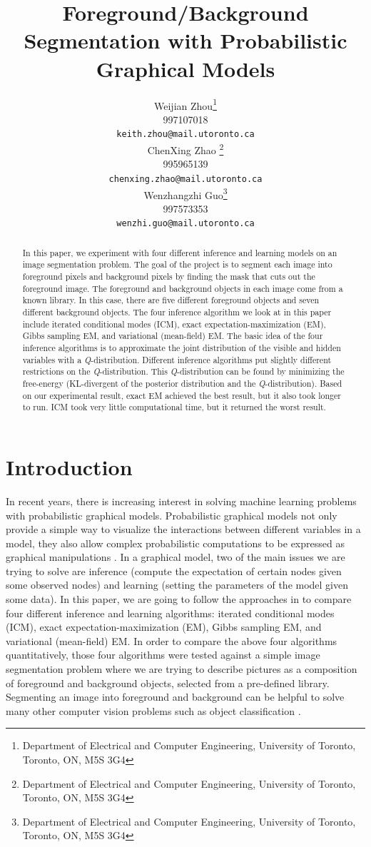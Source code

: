 \documentclass{article} %
\title{Foreground/Background Segmentation with Probabilistic Graphical Models}
\author{
Weijian Zhou\thanks{Department of Electrical and Computer Engineering, University of Toronto, Toronto, ON, M5S 3G4} \\
997107018 \\
\texttt{keith.zhou@mail.utoronto.ca} \\
\And
ChenXing Zhao \thanks{Department of Electrical and Computer Engineering, University of Toronto, Toronto, ON, M5S 3G4} \\
995965139\\
\texttt{chenxing.zhao@mail.utoronto.ca} \\
\AND
Wenzhangzhi Guo\thanks{Department of Electrical and Computer Engineering, University of Toronto, Toronto, ON, M5S 3G4} \\
997573353 \\
\texttt{wenzhi.guo@mail.utoronto.ca} \\
}
\begin{document}
\maketitle

\begin{abstract}
In this paper, we experiment with four different inference and learning models on an image segmentation problem. The goal of the project is to segment each image into foreground pixels and background pixels by finding the mask that cuts out the foreground image. The foreground and background objects in each image come from a known library. In this case, there are five different foreground objects and seven different background objects. The four inference algorithm we look at in this paper include iterated conditional modes (ICM), exact expectation-maximization (EM), Gibbs sampling EM, and variational (mean-field) EM. The basic idea of the four inference algorithms is to approximate the joint distribution of the visible and hidden variables with a \textit{Q}-distribution. Different inference algorithms put slightly different restrictions on the \textit{Q}-distribution. This \textit{Q}-distribution can be found by minimizing the free-energy (KL-divergent of the posterior distribution and the \textit{Q}-distribution). Based on our experimental result, exact EM achieved the best result, but it also took longer to run. ICM took very little computational time, but it returned the worst result. 
\end{abstract}

\section{Introduction}
\label{intro}
In recent years, there is increasing interest in solving machine learning problems with probabilistic graphical models. Probabilistic graphical models not only provide a simple way to visualize the interactions between different variables in a model, they also allow complex probabilistic computations to be expressed as graphical manipulations \cite{b1}. In a graphical model, two of the main issues we are trying to solve are inference (compute the expectation of certain nodes given some observed nodes) and learning (setting the parameters of the model given some data). In this paper, we are going to follow the approaches in \cite{b2} to compare four different inference and learning algorithms: iterated conditional modes (ICM), exact expectation-maximization (EM), Gibbs sampling EM, and variational (mean-field) EM. In order to compare the above four algorithms quantitatively, those four algorithms were tested against a simple image segmentation problem where we are trying to describe pictures as a composition of foreground and background objects, selected from a pre-defined library. Segmenting an image into foreground and background can be helpful to solve many other computer vision problems such as object classification \cite{b2}.
\end{document}
